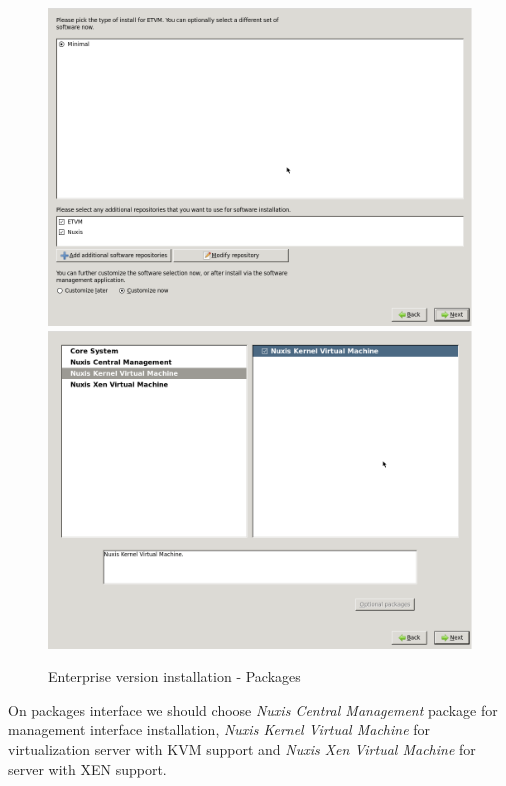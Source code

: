 \begin{figure}[H]
	\begin{center}
	\includegraphics[scale=0.2]{screenshots/install/nuxis/packages_selection_01.png}
	\includegraphics[scale=0.2]{screenshots/install/nuxis/packages_selection_02.png}
    \caption{Enterprise version installation - Packages}
	\label{fig:installation_enterprise_05}
	\end{center}
\end{figure}


On packages interface we should choose \emph{Nuxis Central Management} package for management interface installation, \emph{Nuxis Kernel Virtual Machine} for virtualization server with KVM support and \emph{Nuxis Xen Virtual Machine} for server with XEN support.

